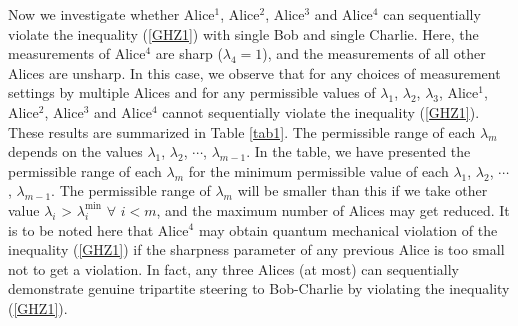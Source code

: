\documentclass[pra,a4paper,aps,twocolumn,showpacs,superscriptaddress,groupedaddress]{revtex4}
\begin{document}
Now we  investigate whether Alice$^1$, Alice$^2$, Alice$^3$ and Alice$^4$ can sequentially violate the inequality (\ref{GHZ1}) with single Bob and single Charlie. Here, the measurements of Alice$^4$ are sharp ($\lambda_4 = 1$), and the measurements of all other Alices are unsharp. In this case, we observe that for any choices of measurement settings by multiple Alices and for any permissible values of $\lambda_1$, $\lambda_2$, $\lambda_3$, Alice$^1$, Alice$^2$, Alice$^3$ and Alice$^4$ cannot sequentially violate the inequality (\ref{GHZ1}). These results are summarized in Table \ref{tab1}.    The permissible range of each $\lambda_m$ depends on the values $\lambda_1$, $\lambda_2$, $\cdots$, $\lambda_{m-1}$. In the table, we have presented the permissible range of each $\lambda_m$ for the minimum permissible value of each $\lambda_1$, $\lambda_2$, $\cdots$, $\lambda_{m-1}$. The permissible range of $\lambda_m$ will be smaller than this if we take other value $\lambda_i$ > $\lambda_i^{\text{min}}$ $\forall$ $i < m$, and the maximum number of Alices may get reduced. It is to be noted here that Alice$^4$ may obtain quantum mechanical violation of the  inequality (\ref{GHZ1}) if the sharpness parameter of any previous Alice is too small not to get a violation. In fact, any three Alices (at most) can sequentially demonstrate genuine tripartite steering to Bob-Charlie by  violating the inequality (\ref{GHZ1}).
\end{document}
